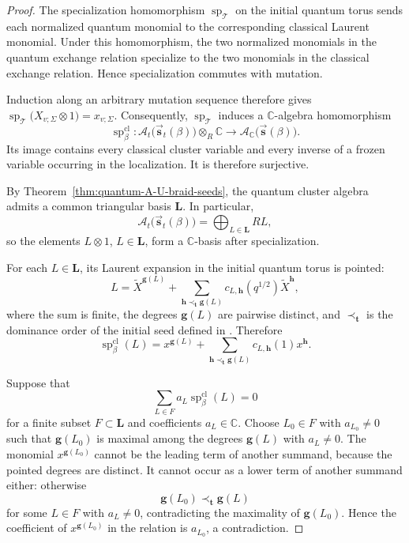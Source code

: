 \documentclass[12pt, reqno]{amsart}
\theoremstyle{plain}
\theoremstyle{definition}
\numberwithin{equation}{section}
\newcommand{\CC}{\mathbb{C}}
\begin{document}
\begin{proof}
The specialization homomorphism
\(\operatorname{sp}_{\mathcal T}\) on the initial quantum torus sends
each normalized quantum monomial to the corresponding classical
Laurent monomial. Under this homomorphism, the two normalized
monomials in the quantum exchange relation specialize to the two
monomials in the classical exchange relation. Hence specialization
commutes with mutation.

Induction along an arbitrary mutation sequence therefore gives
\(    \operatorname{sp}_{\mathcal T}
    \bigl(X_{v;\Sigma}\otimes1\bigr)
    =
    x_{v;\Sigma}.
\)
Consequently, \(\operatorname{sp}_{\mathcal T}\) induces a
\(\CC\)-algebra homomorphism
\[
    \operatorname{sp}^{\mathrm{cl}}_\beta\colon
    \mathcal A_t\bigl(
        \overrightarrow{\mathbf s}_t(\beta)
    \bigr)\otimes_R\CC
    \longrightarrow
    \mathcal A_{\CC}\bigl(
        \overrightarrow{\mathbf s}(\beta)
    \bigr).
\]
Its image contains every classical cluster variable and every inverse
of a frozen variable occurring in the localization. It is therefore
surjective.

By Theorem~\ref{thm:quantum-A-U-braid-seeds}, the quantum cluster
algebra admits a common triangular basis \(\mathbf L\). In particular,
\[
    \mathcal A_t\bigl(
        \overrightarrow{\mathbf s}_t(\beta)
    \bigr)
    =
    \bigoplus_{L\in\mathbf L}RL,
\]
so the elements \(L\otimes1\), \(L\in\mathbf L\), form a
\(\CC\)-basis after specialization.

For each \(L\in\mathbf L\), its Laurent expansion in the initial
quantum torus is pointed:
\[
    L
    =
    \widetilde X^{\mathbf g(L)}
    +
    \sum_{\mathbf h\prec_{\mathbf t}\mathbf g(L)}
        c_{L,\mathbf h}(q^{1/2})
        \widetilde X^{\mathbf h},
\]
where the sum is finite, the degrees \(\mathbf g(L)\) are pairwise
distinct, and \(\prec_{\mathbf t}\) is the dominance order of the
initial seed defined in \cite[Definition~2.3]{qin2024analogs}.
Therefore
\[
    \operatorname{sp}^{\mathrm{cl}}_\beta(L)
    =
    x^{\mathbf g(L)}
    +
    \sum_{\mathbf h\prec_{\mathbf t}\mathbf g(L)}
        c_{L,\mathbf h}(1)x^{\mathbf h}.
\]

Suppose that
\[
    \sum_{L\in F}
        a_L\operatorname{sp}^{\mathrm{cl}}_\beta(L)
    =
    0
\]
for a finite subset \(F\subset\mathbf L\) and coefficients
\(a_L\in\CC\). Choose \(L_0\in F\) with \(a_{L_0}\neq0\) such that
\(\mathbf g(L_0)\) is maximal among the degrees
\(\mathbf g(L)\) with \(a_L\neq0\). The monomial
\(x^{\mathbf g(L_0)}\) cannot be the leading term of another summand,
because the pointed degrees are distinct. It cannot occur as a lower
term of another summand either: otherwise
\[
    \mathbf g(L_0)\prec_{\mathbf t}\mathbf g(L)
\]
for some \(L\in F\) with \(a_L\neq0\), contradicting the maximality
of \(\mathbf g(L_0)\). Hence the coefficient of
\(x^{\mathbf g(L_0)}\) in the relation is \(a_{L_0}\), a
contradiction.


\end{proof}
\end{document}
